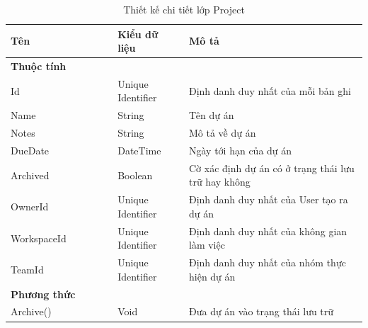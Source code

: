 \documentclass[../DoAn.tex]{subfiles}
\begin{document}
\begin{table}[H]
    \renewcommand{\arraystretch}{1.2}
    \centering{}
    \begin{tabular}{p{0.3\linewidth}p{0.2\linewidth}p{0.5\linewidth}}
        \hline
        \textbf{Tên} & \textbf{Kiểu dữ liệu} & \textbf{Mô tả}                                      \\ \hline
        \textbf{Thuộc tính}                                                                        \\ \hline
        Id           & Unique Identifier     & Định danh duy nhất của mỗi bản ghi                  \\ \hline
        Name         & String                & Tên dự án                                           \\ \hline
        Notes        & String                & Mô tả về dự án                                      \\ \hline
        DueDate      & DateTime              & Ngày tới hạn của dự án                              \\ \hline
        Archived     & Boolean               & Cờ xác định dự án có ở trạng thái lưu trữ hay không \\ \hline
        OwnerId      & Unique Identifier     & Định danh duy nhất của User tạo ra dự án            \\ \hline
        WorkspaceId  & Unique Identifier     & Định danh duy nhất của không gian làm việc          \\ \hline
        TeamId       & Unique Identifier     & Định danh duy nhất của nhóm thực hiện dự án         \\ \hline
        \textbf{Phương thức}                                                                       \\ \hline
        Archive()    & Void                  & Đưa dự án vào trạng thái lưu trữ                    \\ \hline
    \end{tabular}
    \renewcommand{\arraystretch}{1}
    \caption{Thiết kế chi tiết lớp Project}
    \label{fig:classdesign_project}
\end{table}
\end{document}
